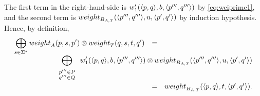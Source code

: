 \noindent
The first term in the right-hand-side is 
$\wei'_1(\< p, q>, b, \< p''', q'''>)$ by \eqref{eq:weiprime1},
and the second term is
$\weight_{B_{A,T}}(\< p''', q'''>, u, \< p', q'>)$ by induction hypothesis.
Hence, by definition, 
\[
\begin{array}{rcl}
\displaystyle\bigoplus_{s \in \Sigma^*} 
\displaystyle\weight_A(p, s, p') \otimes \weight_T(q, s, t, q') & = & \\
\multicolumn{3}{r}{%
\displaystyle\bigoplus_{\begin{array}{c}
                        \scriptstyle p''' \in P\\[-1ex]
                        \scriptstyle q''' \in Q
                        \end{array}}
 \wei'_1(\< p, q>, b, \< p''', q'''>) \otimes
 \weight_{B_{A,T}}(\< p''', q'''>, u, \< p', q'>)}\\
 & = & \weight_{B_{A,T}}(\< p, q>, t, \< p', q'>).\\
\end{array}
\]




